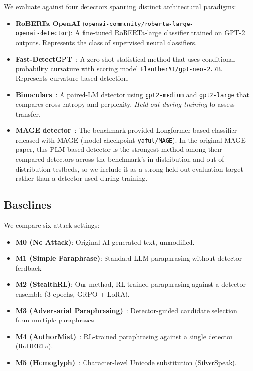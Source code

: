 \documentclass[11pt]{article}
\begin{document}
We evaluate against four detectors spanning distinct architectural paradigms:

\begin{itemize}[leftmargin=*,itemsep=2pt]
  \item \textbf{RoBERTa OpenAI} (\texttt{openai-community/roberta-large-}\\\texttt{openai-detector}): A fine-tuned RoBERTa-large classifier trained on GPT-2 outputs. Represents the class of supervised neural classifiers.
  \item \textbf{Fast-DetectGPT}~\cite{bao2024fastdetectgptefficientzeroshotdetection}: A zero-shot statistical method that uses conditional probability curvature with scoring model \texttt{EleutherAI/gpt-neo-2.7B}. Represents curvature-based detection.
  \item \textbf{Binoculars}~\cite{hans2024spottingllmsbinocularszeroshot}: A paired-LM detector using \texttt{gpt2-medium} and \texttt{gpt2-large} that compares cross-entropy and perplexity. \emph{Held out during training} to assess transfer.
  \item \textbf{MAGE detector}~\cite{li2024magemachinegeneratedtextdetection}: The benchmark-provided Longformer-based classifier released with MAGE (model checkpoint \texttt{yaful/MAGE}). In the original MAGE paper, this PLM-based detector is the strongest method among their compared detectors across the benchmark's in-distribution and out-of-distribution testbeds, so we include it as a strong held-out evaluation target rather than a detector used during training.
\end{itemize}

\subsection{Baselines}

We compare six attack settings:
\begin{itemize}[leftmargin=*,itemsep=2pt]
  \item \textbf{M0 (No Attack)}: Original AI-generated text, unmodified.
  \item \textbf{M1 (Simple Paraphrase)}: Standard LLM paraphrasing without detector feedback.
  \item \textbf{M2 (StealthRL)}: Our method, RL-trained paraphrasing against a detector ensemble (3 epochs, GRPO + LoRA).
  \item \textbf{M3 (Adversarial Paraphrasing)}~\cite{cheng2025adversarialparaphrasinguniversalattack}: Detector-guided candidate selection from multiple paraphrases.
  \item \textbf{M4 (AuthorMist)}~\cite{david2025authormistevadingaitext}: RL-trained paraphrasing against a single detector (RoBERTa).
  \item \textbf{M5 (Homoglyph)}~\cite{creo2025silverspeakevadingaigeneratedtext}: Character-level Unicode substitution (SilverSpeak).
\end{itemize}
\end{document}
